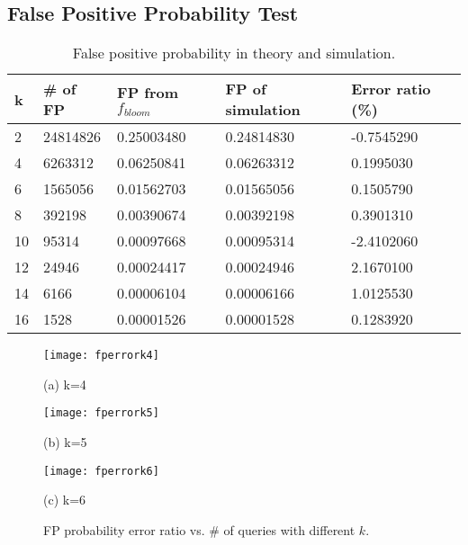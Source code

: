 \presub
\subsection{False Positive Probability Test} \postsub

\begin{table}[htbp]
\vspace{0in}
	\centering\caption{False positive probability in theory and simulation.}
\vspace{0in}
	\begin{tabular}{l l l l l}
		\hline
		k   &	\# of FP	&	FP from $f_{bloom}$	&	FP of simulation	&	Error ratio	(\%)\\
		\hline
		2	&	24814826	&	0.25003480 	&	0.24814830 	&	-0.7545290 	\\
		4	&	6263312	&	0.06250841 	&	0.06263312 	&	0.1995030 	\\
		6	&	1565056	&	0.01562703 	&	0.01565056 	&	0.1505790 	\\
		8	&	392198	&	0.00390674 	&	0.00392198 	&	0.3901310 	\\
		10	&	95314	&	0.00097668 	&	0.00095314 	&	-2.4102060 	\\
		12	&	24946	&	0.00024417 	&	0.00024946 	&	2.1670100 	\\
		14	&	6166	&	0.00006104 	&	0.00006166 	&	1.0125530 	\\
		16	&	1528	&	0.00001526 	&	0.00001528 	&	0.1283920 	\\
		\hline
	\end{tabular}
	\label{table:fp:theory:sim}
\end{table}


\begin{figure*}[htbp]
 	\begin{minipage}{0.28\linewidth}
 		\centerline{\texttt{[image: fperrork4]}}
 		\centerline{(a) k=4}
 	\end{minipage}
 	\hfill
 	\begin{minipage}{0.28\linewidth}
 		\centerline{\texttt{[image: fperrork5]}}
 		\centerline{(b) k=5}
 	\end{minipage}
 	\hfill
 	\begin{minipage}{0.28\linewidth}
 		\centerline{\texttt{[image: fperrork6]}}
 		\centerline{(c) k=6}
 	\end{minipage}
 	\caption{FP probability error ratio vs. \# of queries with different $k$.}  \vspace{0in}
 	\label{fig:error:ratio}
 \end{figure*}

